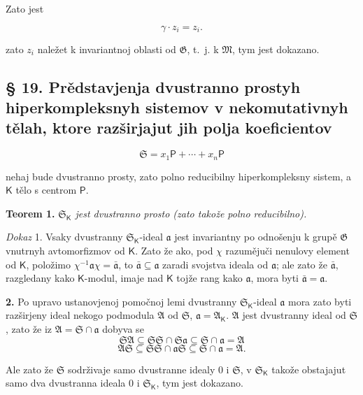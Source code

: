 \documentclass[11pt]{article}
\begin{document}
Zato jest

\[
\gamma\cdot z_i=z_i.
\]

zato \(z_i\) naležet k invariantnoj oblasti od \(\mathfrak G\), t.~j. k \(\mathfrak M\), tym jest dokazano.

\subsection*{§ 19. Prědstavjenja dvustranno prostyh hiperkompleksnyh sistemov v nekomutativnyh tělah, ktore razširjajut jih polja koeficientov}\label{darstellungen-zweiseitig-einfacher-hyperkomplexer-systeme-in-nichtkommutativen-erweiterungskoerpern-ihrer-koeffizientenkoerper}

\[
\mathfrak S=x_1\mathsf P+\cdots+x_n\mathsf P
\]

nehaj bude dvustranno prosty, zato polno reducibilny hiperkompleksny sistem, a \(\mathsf K\) tělo s centrom \(\mathsf P\).

\textbf{Teorem 1.} \emph{\(\mathfrak S_{\mathsf K}\) jest dvustranno prosto (zato takože polno reducibilno).}

\emph{Dokaz} 1. Vsaky dvustranny \(\mathfrak S_{\mathsf K}\)-ideal \(\mathfrak a\) jest invariantny po odnošenju k grupě \(\mathfrak G\) vnutrnyh avtomorfizmov od \(\mathsf K\). Zato že ako, pod \(\chi\) razumějuči nenulovy element od \(\mathsf K\), položimo \(\chi^{-1}\mathfrak a\chi=\bar{\mathfrak a}\), to \(\bar{\mathfrak a}\subseteq\mathfrak a\) zaradi svojstva ideala od \(\mathfrak a\); ale zato že \(\bar{\mathfrak a}\), razgledany kako \(\mathsf K\)-modul, imaje nad \(\mathsf K\) tojže rang kako \(\mathfrak a\), mora byti \(\bar{\mathfrak a}=\mathfrak a\).

\textbf{2.} Po upravo ustanovjenoj pomočnoj lemi dvustranny \(\mathfrak S_{\mathsf K}\)-ideal \(\mathfrak a\) mora zato byti razširjeny ideal nekogo podmodula \(\mathfrak A\) od \(\mathfrak S\), \(\mathfrak a=\mathfrak A_{\mathsf K}\). \(\mathfrak A\) jest dvustranny ideal od \(\mathfrak S\), zato že iz \(\mathfrak A=\mathfrak S\cap\mathfrak a\) dobyva se
\[
\mathfrak S\mathfrak A\subseteq\mathfrak S\mathfrak S\cap\mathfrak S\mathfrak a\subseteq\mathfrak S\cap\mathfrak a=\mathfrak A
\]
\[
\mathfrak A\mathfrak S\subseteq\mathfrak S\mathfrak S\cap\mathfrak a\mathfrak S\subseteq\mathfrak S\cap\mathfrak a=\mathfrak A.
\]

Ale zato že \(\mathfrak S\) sodrživaje samo dvustranne idealy 0 i \(\mathfrak S\), v \(\mathfrak S_{\mathsf K}\) takože obstajajut samo dva dvustranna ideala 0 i \(\mathfrak S_{\mathsf K}\), tym jest dokazano.
\end{document}

